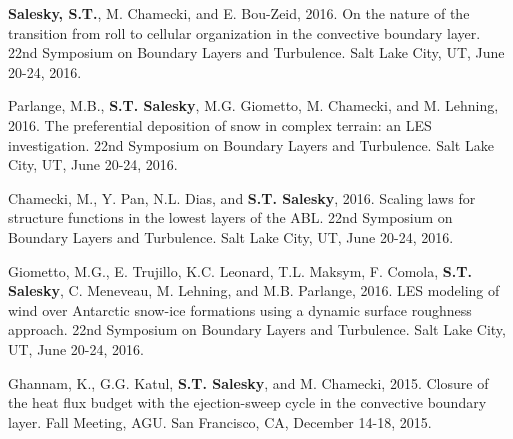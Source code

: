 \documentclass[11pt,letterpaper]{article}
\begin{document}





\textbf{Salesky, S.T.}, M. Chamecki, and E. Bou-Zeid, 2016. On the nature of the
transition from roll to cellular organization in the convective boundary layer.
22nd Symposium on Boundary Layers and Turbulence. Salt Lake City, UT, June
20-24, 2016.

Parlange, M.B., \textbf{S.T. Salesky}, M.G. Giometto, M. Chamecki, and M.
Lehning, 2016.  The preferential deposition of snow in complex terrain: an LES
investigation.  22nd Symposium on Boundary Layers and Turbulence. Salt Lake
City, UT, June 20-24, 2016.

Chamecki, M., Y. Pan, N.L. Dias, and \textbf{S.T. Salesky}, 2016. Scaling laws for
structure functions in the lowest layers of the ABL.  22nd Symposium on
Boundary Layers and Turbulence. Salt Lake City, UT, June 20-24, 2016.

Giometto, M.G., E. Trujillo, K.C. Leonard, T.L. Maksym, F. Comola, \textbf{S.T.
  Salesky}, C. Meneveau, M. Lehning, and M.B. Parlange, 2016.  LES modeling of
wind over Antarctic snow-ice formations using a dynamic surface roughness
approach.  22nd Symposium on Boundary Layers and Turbulence. Salt Lake City,
UT, June 20-24, 2016.

Ghannam, K., G.G. Katul, \textbf{S.T. Salesky}, and M. Chamecki, 2015. Closure
of the heat flux budget with the ejection-sweep cycle in the convective
boundary layer. Fall Meeting, AGU. San Francisco, CA, December 14-18, 2015.
\end{document}
